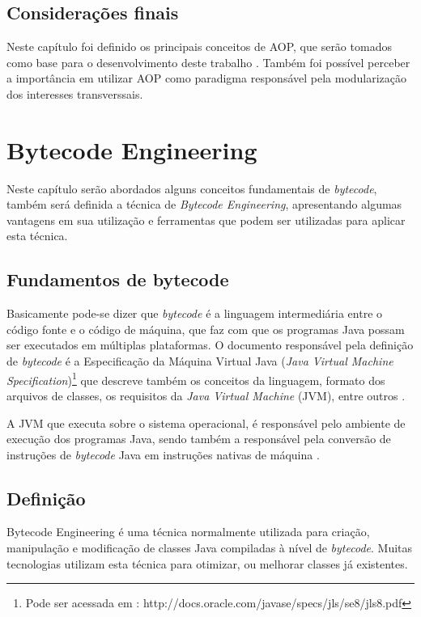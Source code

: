\documentclass[tc,openright]{iiufrgs}
\begin{document}
\section{Considerações finais}

Neste capítulo foi definido os principais conceitos de AOP, que serão tomados como base para o desenvolvimento deste trabalho . Também foi possível perceber a importância em utilizar AOP como paradigma responsável pela modularização dos interesses transverssais.

\chapter{Bytecode Engineering}
Neste capítulo serão abordados alguns conceitos fundamentais de \textit{bytecode}, também será definida a técnica de \textit{Bytecode Engineering}, apresentando algumas vantagens em sua utilização e ferramentas que podem ser utilizadas para aplicar esta técnica. 

\section{Fundamentos de bytecode}

Basicamente pode-se dizer que \textit{bytecode} é a linguagem intermediária entre o código fonte e o código de máquina, que faz com que os programas Java possam ser executados em múltiplas plataformas. O documento responsável pela definição de \textit{bytecode} é a Especificação da Máquina Virtual Java (\textit{Java Virtual Machine Specification})\footnote{Pode ser acessada em : http://docs.oracle.com/javase/specs/jls/se8/jls8.pdf} que descreve também os conceitos da linguagem, formato dos arquivos de classes, os requisitos da \textit{Java Virtual Machine} (JVM), entre outros \cite{kalinovsky2004covert}.

A JVM que executa sobre o sistema operacional, é responsável pelo ambiente de execução dos programas Java, sendo também a responsável pela conversão de instruções de \textit{bytecode} Java em instruções nativas de máquina \cite{stark2001java}.

\section{Definição}
Bytecode Engineering é uma técnica normalmente utilizada para criação, manipulação e modificação de classes Java compiladas à nível de \textit{bytecode}. Muitas tecnologias  utilizam esta técnica para otimizar, ou melhorar classes já existentes.
\end{document}
